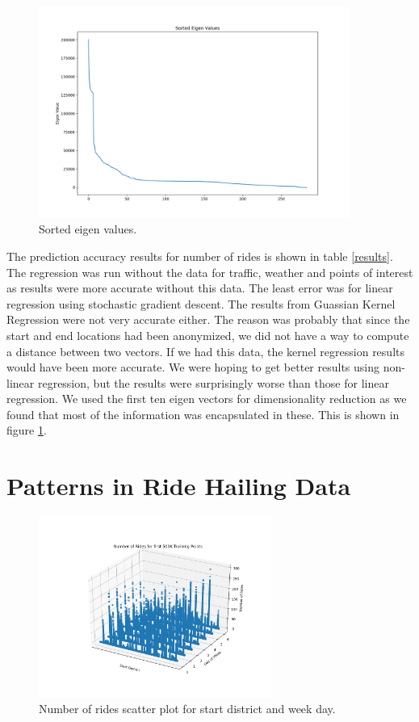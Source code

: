 \documentclass[paper=a4, fontsize=11pt]{scrartcl} %
\numberwithin{equation}{section} %
\numberwithin{table}{section} %
\begin{document}
\begin{figure}[!htb]
\centering
\includegraphics[width=4in]{figures/EigenValues.png}
\caption{Sorted eigen values.}
\label{eigen10}
\end{figure}

The prediction accuracy results for number of rides is shown in table \ref{results}. The regression was run without the data for traffic, weather and points of interest as results were more accurate without this data. The least error was for linear regression using stochastic gradient descent. The results from Guassian Kernel Regression were not very accurate either. The reason was probably that since the start and end locations had been anonymized, we did not have a way to compute a distance between two vectors. If we had this data, the kernel regression results would have been more accurate. We were hoping to get better results using non-linear regression, but the results were surprisingly worse than those for linear regression. We used the first ten eigen vectors for dimensionality reduction as we found that most of the information was encapsulated in these. This is shown in figure \ref{eigen10}.
\section{Patterns in Ride Hailing Data}

\begin{figure}[!htb]
\centering
\includegraphics[width=3in]{figures/Ridesfordistrictsandweekdays3DScatter.png}
\caption{Number of rides scatter plot for start district and week day.}
\label{rides2}
\end{figure}
\end{document}

